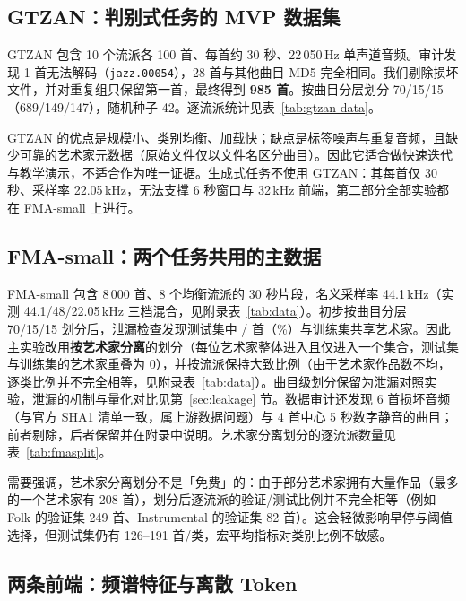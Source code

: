 \documentclass[UTF8,10pt,a4paper]{ctexart}
\begin{document}
\subsection{GTZAN：判别式任务的 MVP 数据集}\label{sec:gtzan}
GTZAN 包含 10 个流派各 100 首、每首约 30 秒、22\,050\,Hz 单声道音频。审计发现 1 首无法解码（\texttt{jazz.00054}），28 首与其他曲目 MD5 完全相同。我们剔除损坏文件，并对重复组只保留第一首，最终得到 \textbf{985 首}。按曲目分层划分 70/15/15（689/149/147），随机种子 42。逐流派统计见表~\ref{tab:gtzan-data}。



GTZAN 的优点是规模小、类别均衡、加载快；缺点是标签噪声与重复音频，且缺少可靠的艺术家元数据（原始文件仅以文件名区分曲目）。因此它适合做快速迭代与教学演示，不适合作为唯一证据。生成式任务不使用 GTZAN：其每首仅 30 秒、采样率 22.05\,kHz，无法支撑 6 秒窗口与 32\,kHz 前端，第二部分全部实验都在 FMA-small 上进行。

\subsection{FMA-small：两个任务共用的主数据}\label{sec:fma}
FMA-small 包含 8\,000 首、8 个均衡流派的 30 秒片段，名义采样率 44.1\,kHz（实测 44.1/48/22.05\,kHz 三档混合，见附录表~\ref{tab:data}）。初步按曲目分层 70/15/15 划分后，泄漏检查发现测试集中 \FmaTrackLeak{} / \FmaTrackLeakN{} 首（\FmaTrackLeakPct\%）与训练集共享艺术家。因此主实验改用\textbf{按艺术家分离}的划分（每位艺术家整体进入且仅进入一个集合，测试集与训练集的艺术家重叠为 0），并按流派保持大致比例（由于艺术家作品数不均，逐类比例并不完全相等，见附录表~\ref{tab:data}）。曲目级划分保留为泄漏对照实验，泄漏的机制与量化对比见第~\ref{sec:leakage} 节。数据审计还发现 6 首损坏音频（与官方 SHA1 清单一致，属上游数据问题）与 4 首中心 5 秒数字静音的曲目；前者剔除，后者保留并在附录中说明。艺术家分离划分的逐流派数量见表~\ref{tab:fmasplit}。



需要强调，艺术家分离划分不是「免费」的：由于部分艺术家拥有大量作品（最多的一个艺术家有 208 首），划分后逐流派的验证/测试比例并不完全相等（例如 Folk 的验证集 249 首、Instrumental 的验证集 82 首）。这会轻微影响早停与阈值选择，但测试集仍有 126--191 首/类，宏平均指标对类别比例不敏感。

\subsection{两条前端：频谱特征与离散 Token}\label{sec:frontend}
\end{document}

